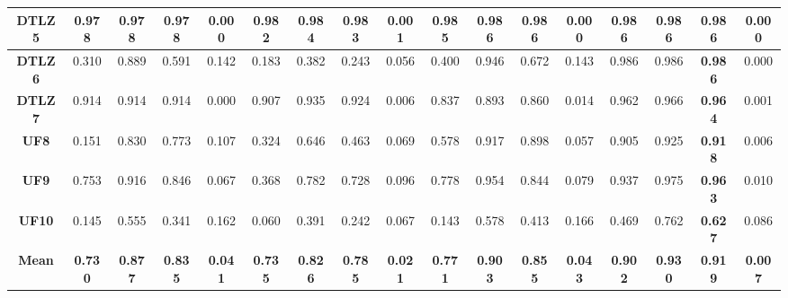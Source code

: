 \begin{table*}
{\begin{tabular}{c|c|c|c|c|c|c|c|c|c|c|c|c|c|c|c|c}
\hline
\textbf{DTLZ5}        & 0.978           & 0.978           & 0.978           & 0.000           & 0.982           & 0.984           & 0.983           & 0.001           & 0.985           & 0.986           & \textbf{0.986 } & 0.000           & 0.986           & 0.986           & \textbf{0.986 } & 0.000            \\ 
\hline
\textbf{DTLZ6}        & 0.310           & 0.889           & 0.591           & 0.142           & 0.183           & 0.382           & 0.243           & 0.056           & 0.400           & 0.946           & 0.672           & 0.143           & 0.986           & 0.986           & \textbf{0.986 } & 0.000            \\ 
\hline
\textbf{DTLZ7}        & 0.914           & 0.914           & 0.914           & 0.000           & 0.907           & 0.935           & 0.924           & 0.006           & 0.837           & 0.893           & 0.860           & 0.014           & 0.962           & 0.966           & \textbf{0.964 } & 0.001            \\ 
\hline
\textbf{UF8}          & 0.151           & 0.830           & 0.773           & 0.107           & 0.324           & 0.646           & 0.463           & 0.069           & 0.578           & 0.917           & 0.898           & 0.057           & 0.905           & 0.925           & \textbf{0.918 } & 0.006            \\ 
\hline
\textbf{UF9}          & 0.753           & 0.916           & 0.846           & 0.067           & 0.368           & 0.782           & 0.728           & 0.096           & 0.778           & 0.954           & 0.844           & 0.079           & 0.937           & 0.975           & \textbf{0.963 } & 0.010            \\ 
\hline
\textbf{UF10}         & 0.145           & 0.555           & 0.341           & 0.162           & 0.060           & 0.391           & 0.242           & 0.067           & 0.143           & 0.578           & 0.413           & 0.166           & 0.469           & 0.762           & \textbf{0.627 } & 0.086            \\ 
\hline
\textbf{Mean}         & \textbf{0.730}  & \textbf{0.877}  & \textbf{0.835}  & \textbf{0.041}  & \textbf{0.735}  & \textbf{0.826}  & \textbf{0.785}  & \textbf{0.021}  & \textbf{0.771}  & \textbf{0.903}  & \textbf{0.855}  & \textbf{0.043}  & \textbf{0.902}  & \textbf{0.930}  & \textbf{0.919}  & \textbf{0.007}   \\
\hline
\end{tabular}
}
\end{table*}
